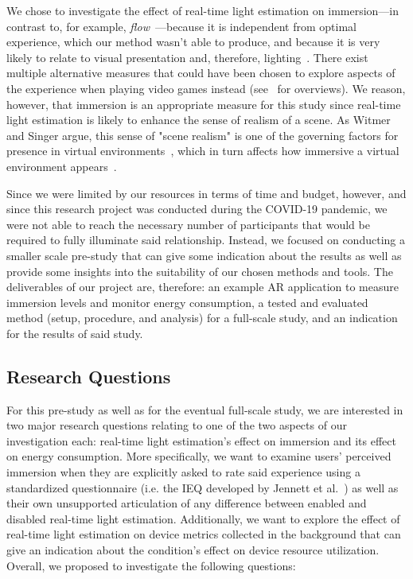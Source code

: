 \documentclass[12pt,twoside,english]{article}
\begin{document}
We chose to investigate the effect of real-time light estimation on immersion---in contrast to, for example, \textit{flow}~\cite{csikszentmihalyi_flow_1990}---because it is independent from optimal experience, which our method wasn't able to produce, and because it is very likely to relate to visual presentation and, therefore, lighting~\cite{jennett_measuring_2008}.
There exist multiple alternative measures that could have been chosen to explore aspects of the experience when playing video games instead (see~\cite{dey_systematic_2018, dunser_survey_2008} for overviews).
We reason, however, that immersion is an appropriate measure for this study since real-time light estimation is likely to enhance the sense of realism of a scene.
As Witmer and Singer argue, this sense of "scene realism" is one of the governing factors for presence in virtual environments~\cite{witmer_measuring_1998}, which in turn affects how immersive a virtual environment appears~\cite{jennett_measuring_2008}.

Since we were limited by our resources in terms of time and budget, however, and since this research project was conducted during the COVID-19 pandemic, we were not able to reach the necessary number of participants that would be required to fully illuminate said relationship.
Instead, we focused on conducting a smaller scale pre-study that can give some indication about the results as well as provide some insights into the suitability of our chosen methods and tools.
The deliverables of our project are, therefore: an example \gls{AR} application to measure immersion levels and monitor energy consumption, a tested and evaluated method (setup, procedure, and analysis) for a full-scale study, and an indication for the results of said study.

\subsection{Research Questions}

For this pre-study as well as for the eventual full-scale study, we are interested in two major research questions relating to one of the two aspects of our investigation each: real-time light estimation's effect on immersion and its effect on energy consumption.
More specifically, we want to examine users' perceived immersion when they are explicitly asked to rate said experience using a standardized questionnaire (i.e. the \gls{IEQ} developed by Jennett et al.~\cite{jennett_measuring_2008}) as well as their own unsupported articulation of any difference between enabled and disabled real-time light estimation.
Additionally, we want to explore the effect of real-time light estimation on device metrics collected in the background that can give an indication about the condition's effect on device resource utilization.
Overall, we proposed to investigate the following questions:
\end{document}
